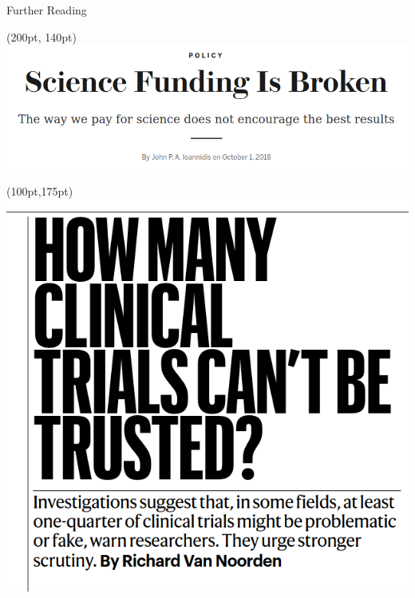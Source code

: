 \documentclass{beamer}
\begin{document}
\begin{frame}{Further Reading}
	\begin{textblock*}{160pt}(200pt, 140pt)
		\includegraphics[width=1\textwidth]{../images/sciencefunding.png}
	\end{textblock*}

	\begin{textblock*}{80pt}(100pt,175pt)
		\includegraphics[width=1\textwidth]{../images/25percentClinicalTrialsFalse.png}
	\end{textblock*}

\end{frame}
\end{document}
